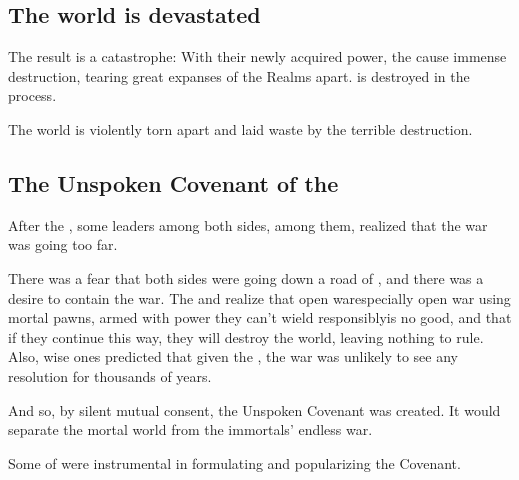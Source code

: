 \subsection{The world is devastated}
The result is a catastrophe: 
With their newly acquired power, the \cuezcans{} cause immense destruction, tearing great expanses of the Realms apart. 
\Cuezca{} is destroyed in the process. 

The world is violently torn apart and laid waste by the terrible destruction. 










\subsection{The Unspoken Covenant of the \Charade}
After the \CuezcanApocalypse, some leaders among both sides, \Ishnaruchaefir{} among them, realized that the war was going too far.

There was a fear that both sides were going down a road of , and there was a desire to contain the war.
The \dragons{} and \banes{} realize that open war\dash especially open war using mortal pawns, armed with power they can't wield responsibly\dash is no good, and that if they continue this way, they will destroy the world, leaving nothing to rule. 
Also, wise ones predicted that given the , the war was unlikely to see any resolution for thousands of years. 

And so, by silent mutual consent, the Unspoken Covenant was created.
It would separate the mortal world from the immortals' endless war. 

Some \resphain{} of \TiphredSerah{} were instrumental in formulating and popularizing the Covenant. 

